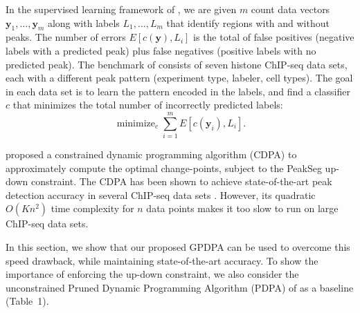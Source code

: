 \documentclass{article}
\DeclareMathOperator*{\minimize}{minimize}
\begin{document}
In the supervised learning framework of \citet{HOCKING2016-chipseq},
we are given $m$ count data vectors $\mathbf y_1,\dots,\mathbf y_m$
along with labels $L_1,\dots, L_m$ that identify regions with and
without peaks. The number of errors $E[c(\mathbf y), L_i]$ is the
total of false positives (negative labels with a predicted peak) plus
false negatives (positive labels with no predicted peak). The
benchmark of consists of seven histone ChIP-seq data sets, each with a
different peak pattern (experiment type, labeler, cell types). The
goal in each data set is to learn the pattern encoded in the labels,
and find a classifier $c$ that minimizes the total number of
incorrectly predicted labels:
\begin{equation}
  \label{eq:learn}
  \minimize_c
  \sum_{i=1}^m E\left[
    c(\mathbf y_i), L_i
  \right].
\end{equation}

\citet{HOCKING-PeakSeg} proposed a constrained dynamic programming
algorithm (CDPA) to approximately compute the optimal change-points,
subject to the PeakSeg up-down constraint. The CDPA has been shown to
achieve state-of-the-art peak detection accuracy in several ChIP-seq
data sets \citep{HOCKING2016-chipseq}. However, its quadratic $O(Kn^2)$
time complexity for $n$ data points makes it too slow to run on large
ChIP-seq data sets. 

In this section, we show that our proposed GPDPA
can be used to overcome this speed drawback, while maintaining
state-of-the-art accuracy. To show the importance of enforcing the
up-down constraint, we also consider the unconstrained Pruned Dynamic
Programming Algorithm (PDPA) of \citet{pruned-dp} as a baseline
(Table~1).
\end{document}
